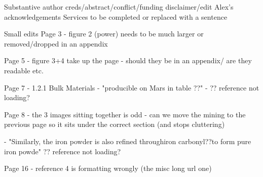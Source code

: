 
Substantive
author creds/abstract/conflict/funding disclaimer/edit Alex's acknowledgements 
Services to be completed or replaced with a sentence

Small edits
Page 3 - figure 2 (power) needs to be much larger or removed/dropped
in an appendix

Page 5 - figure 3+4 take up the page - should they be in an appendix/
are they readable etc.

Page 7 - 1.2.1 Bulk Materials - "producible on Mars in table ??" - ?? reference not loading?

Page 8 - the 3 images sitting together is odd - can we move the mining to 
the previous page so it sits under the correct section (and stops cluttering)

    - "Similarly, the iron powder is also refined throughiron carbonyl??to form pure iron powde" ?? reference not loading?

Page 16 - reference 4 is formatting wrongly (the misc long url one) 

